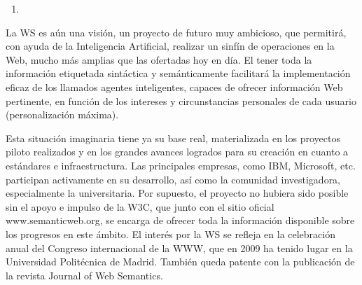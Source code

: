 \begin{enumerate}
	
	\item 
	
\end{enumerate}



La WS es aún una visión, un proyecto de futuro muy ambicioso, que permitirá, con ayuda de la Inteligencia Artificial, realizar un sinfín de operaciones en la Web, mucho más amplias que las ofertadas hoy en día. El tener toda la información etiquetada sintáctica y semánticamente facilitará la implementación eficaz de los llamados agentes inteligentes, capaces de ofrecer información Web pertinente, en función de los intereses y circunstancias personales de cada usuario (personalización máxima).



Esta situación imaginaria tiene ya su base real, materializada en los proyectos piloto realizados y en los grandes avances logrados para su creación en cuanto a estándares e infraestructura. Las principales empresas, como IBM, Microsoft, etc. participan activamente en su desarrollo, así como la comunidad investigadora, especialmente la universitaria. Por supuesto, el proyecto no hubiera sido posible sin el apoyo e impulso de la W3C, que junto con el sitio oficial www.semanticweb.org, se encarga de ofrecer toda la información disponible sobre los progresos en este ámbito. El interés por la WS se refleja en la celebración anual del Congreso internacional de la WWW, que en 2009 ha tenido lugar en la Universidad Politécnica de Madrid. También queda patente con la publicación de la revista Journal of Web Semantics.

